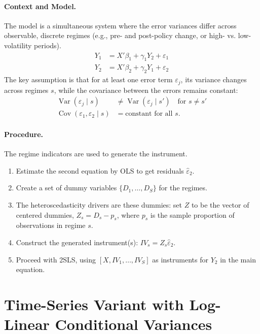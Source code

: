\documentclass{article}
\newcommand{\cov}{\operatorname{Cov}}
\newcommand{\var}{\operatorname{Var}}
\theoremstyle{plain}
\begin{document}
\paragraph{Context and Model.} The model is a simultaneous system where the error variances differ across observable, discrete regimes (e.g., pre- and post-policy change, or high- vs. low-volatility periods).
\begin{align*}
    Y_1 &= X'\beta_1 + \gamma_1 Y_2 + \varepsilon_1 \\
    Y_2 &= X'\beta_2 + \gamma_2 Y_1 + \varepsilon_2
\end{align*}
The key assumption is that for at least one error term \(\varepsilon_j\), its variance changes across regimes \(s\), while the covariance between the errors remains constant:
\begin{align*}
\var(\varepsilon_j \mid s) &\neq \var(\varepsilon_j \mid s') \quad \text{for } s \neq s' \\
\cov(\varepsilon_1, \varepsilon_2 \mid s) &= \text{constant for all } s.
\end{align*}

\paragraph{Procedure.} The regime indicators are used to generate the instrument.
\begin{enumerate}\itemsep2pt
    \item Estimate the second equation by OLS to get residuals \(\hat\varepsilon_{2}\).
    \item Create a set of dummy variables \(\{D_1, \dots, D_S\}\) for the regimes.
    \item The heteroscedasticity drivers are these dummies: set \(Z\) to be the vector of centered dummies, \(Z_s = D_s - p_s\), where \(p_s\) is the sample proportion of observations in regime \(s\).
    \item Construct the generated instrument(s): \(IV_s = Z_s \hat\varepsilon_{2}\).
    \item Proceed with 2SLS, using \([X, IV_1, \dots, IV_S]\) as instruments for \(Y_2\) in the main equation.
\end{enumerate}

\section{Time-Series Variant with Log-Linear Conditional Variances}
\label{sec:timeseries}
\end{document}
